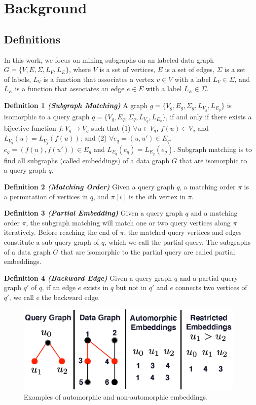 \section{Background}
\subsection{Definitions}
In this work, we focus on mining subgraphs on an labeled data graph $G=\{V,E,\Sigma,L_V,L_E\}$, where $V$ is a set of vertices, $E$ is a set of edges, $\Sigma$ is a set of labels, $L_V$ is a function that associates a vertex $v \in V$ with a label $L_V \in \Sigma$, and $L_E$ is a function that associates an edge $e \in E$ with a label $L_E \in \Sigma$.

\noindent
\textbf{Definition 1 \emph{(Subgraph Matching)}} A graph $g=\{V_g,E_g,\Sigma_g,L_{V_g},L_{E_g}\}$ is isomorphic to a query graph $q=\{V_q,E_q,\Sigma_q,L_{V_q},L_{E_q}\}$, if and only if there exists a bijective function $f: V_q \rightarrow V_g$ such that (1) $\forall u \in V_q$, $f(u) \in V_g$ and $L_{V_q}(u) = L_{V_g}(f(u))$; and (2) $\forall e_q=(u,u') \in E_q$, $e_g=(f(u),f(u')) \in E_g$ and $L_{E_q}(e_q)=L_{E_g}(e_g)$. Subgraph matching is to find all subgraphs (called embeddings) of a data graph $G$ that are isomorphic to a query graph $q$.

\noindent
\textbf{Definition 2 \emph{(Matching Order)}} Given a query graph $q$, a matching order $\pi$ is a permutation of vertices in $q$, and $\pi[i]$ is the $i$th vertex in $\pi$.

\noindent
\textbf{Definition 3 \emph{(Partial Embedding)}} Given a query graph $q$ and a matching order $\pi$, the subgraph matching will match one or two query vertices along $\pi$ iteratively. Before reaching the end of $\pi$, the matched query vertices and edges constitute a sub-query graph of $q$, which we call the partial query. The subgraphs of a data graph $G$ that are isomorphic to the partial query are called partial embeddings.

\noindent
\textbf{Definition 4 \emph{(Backward Edge)}} Given a query graph $q$ and a partial query graph $q'$ of $q$, if an edge $e$ exists in $q$ but not in $q'$ and $e$ connects two vertices of $q'$, we call $e$ the backward edge.

\begin{figure}
\centering
\includegraphics[width=\columnwidth]{./figure/automorphism.eps}
\caption{Examples of automorphic and non-automorphic embeddings.}	
\label{fig:automo}
\end{figure}

